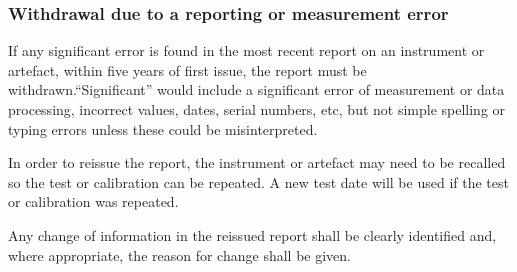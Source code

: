 \subsubsection{Withdrawal due to a reporting or measurement error}
\label{sss:reissue_report}
If any significant error is found in the most recent report on an instrument or artefact, within five years of first issue, the report must be withdrawn.``Significant'' would include a significant error of measurement or data processing, incorrect values, dates, serial numbers, etc, but not simple spelling or typing errors unless these could be misinterpreted.

In order to reissue the report, the instrument or artefact may need to be recalled so the test or calibration can be repeated. A new test date will be used if the test or calibration was repeated.

Any change of information in the reissued report shall be clearly identified and, where appropriate, the reason for change shall be given.

